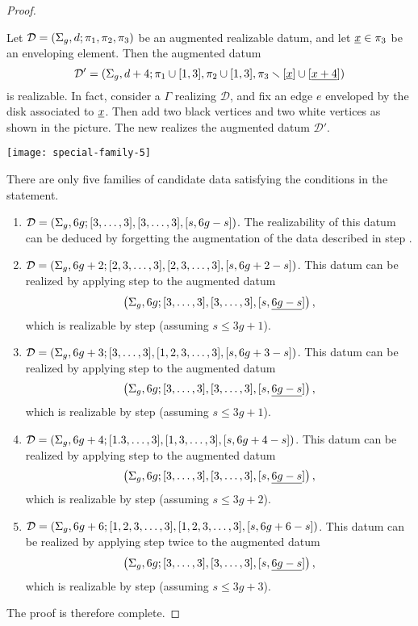 \documentclass{article}
\begin{document}
\begin{proof}
\begin{manycases}
Let $\mathcal{D}=\left(\Sigma_g,d;\pi_1,\pi_2,\pi_3\right)$ be an augmented realizable datum, and let $\underline{x}\in\pi_3$ be an enveloping element. Then the augmented datum
\[
\mathcal{D}'=\left(\Sigma_g,d+4;\pi_1\cup[1,3],\pi_2\cup[1,3],\pi_3\smallsetminus[\underline{x}]\cup[\underline{x+4}]\right)
\]
is realizable. In fact, consider a \dessin{} $\Gamma$ realizing $\mathcal{D}$, and fix an edge $e$ enveloped by the disk associated to $\underline{x}$. Then add two black vertices and two white vertices as shown in the picture. The new \dessin{} realizes the augmented datum $\mathcal{D'}$.
\tcblower
\begin{center}
\texttt{[image: special-family-5]}
\end{center}
\end{manycases}
There are only five families of candidate data satisfying the conditions in the statement.
\begin{enumerate}
\item $\mathcal{D}=\left(\Sigma_g,6g;[3,\ldots,3],[3,\ldots,3],[s,6g-s]\right)$. The realizability of this datum can be deduced by forgetting the augmentation of the data described in step .
\item $\mathcal{D}=\left(\Sigma_g,6g+2;[2,3,\ldots,3],[2,3,\ldots,3],[s,6g+2-s]\right)$. This datum can be realized by applying step  to the augmented datum
\[
\left(\Sigma_g,6g;[3,\ldots,3],[3,\ldots,3],[s,\underline{6g-s}]\right),
\]
which is realizable by step  (assuming $s\le 3g+1$).
\item $\mathcal{D}=\left(\Sigma_g,6g+3;[3,\ldots,3],[1,2,3,\ldots,3],[s,6g+3-s]\right)$. This datum can be realized by applying step  to the augmented datum
\[
\left(\Sigma_g,6g;[3,\ldots,3],[3,\ldots,3],[s,\underline{6g-s}]\right),
\]
which is realizable by step  (assuming $s\le 3g+1$).
\item $\mathcal{D}=\left(\Sigma_g,6g+4;[1.3,\ldots,3],[1,3,\ldots,3],[s,6g+4-s]\right)$. This datum can be realized by applying step  to the augmented datum
\[
\left(\Sigma_g,6g;[3,\ldots,3],[3,\ldots,3],[s,\underline{6g-s}]\right),
\]
which is realizable by step  (assuming $s\le 3g+2$).
\item $\mathcal{D}=\left(\Sigma_g,6g+6;[1,2,3,\ldots,3],[1,2,3,\ldots,3],[s,6g+6-s]\right)$. This datum can be realized by applying step  twice to the augmented datum
\[
\left(\Sigma_g,6g;[3,\ldots,3],[3,\ldots,3],[s,\underline{6g-s}]\right),
\]
which is realizable by step  (assuming $s\le 3g+3$).
\end{enumerate}
The proof is therefore complete.
\end{proof}
\end{document}
